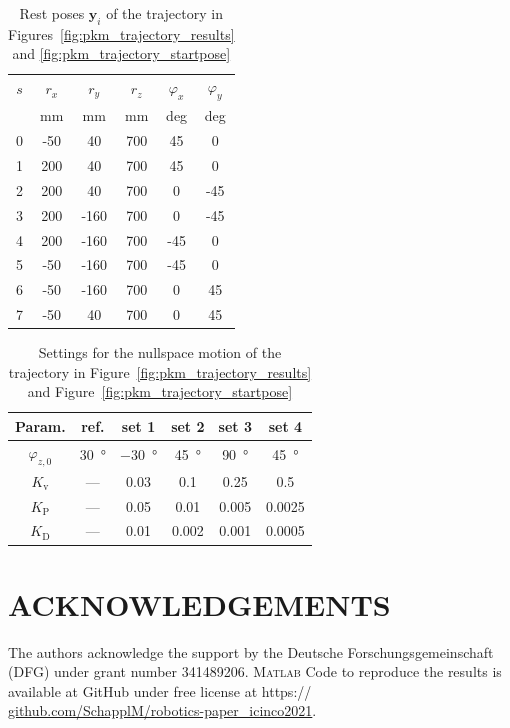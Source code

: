 \documentclass[a4paper,twoside]{article}
\begin{document}
\begin{table}[hb]
	\caption{Rest poses $\bm{y}_i$ of the trajectory in Figures~\ref{fig:pkm_trajectory_results} and \ref{fig:pkm_trajectory_startpose}}
	\label{tab:trajectory_points}
	\centering
	\begin{tabular}[t]{|c|c|c|c|c|c|}
		\hline
		$s$ & $r_x$ & $r_y$ & $r_z$ & $\varphi_x$ & $\varphi_y$ \\
		& mm & mm & mm & deg & deg \\
		\hline
		0 & -50 & 40 & 700 & 45 & 0\\
		1 & 200 & 40 & 700 & 45 & 0\\
		2 & 200 & 40 & 700 & 0 & -45\\
		3 & 200 & -160 & 700 & 0 & -45\\
		4 & 200 & -160 & 700 & -45 & 0\\
		5 & -50 & -160 & 700 & -45 & 0\\
		6 & -50 & -160 & 700 & 0 & 45\\
		7 & -50 & 40 & 700 & 0 & 45\\
		\hline
	\end{tabular}
\end{table}
\begin{table}[b]
	\caption{Settings for the nullspace motion  of the trajectory in Figure~\ref{fig:pkm_trajectory_results} and Figure~\ref{fig:pkm_trajectory_startpose}}
	\label{tab:trajectory_ik_settings}
	\centering
	\begin{tabular}[t]{|c|c|c|c|c|c|}
		\hline
		Param. & ref. & set 1 & set 2 & set 3 & set 4 \\
		\hline
		$\varphi_{z,0}$ & \SI{30}{\degree} & \SI{-30}{\degree} & \SI{45}{\degree} & \SI{90}{\degree} & \SI{45}{\degree}\\
		$K_\mathrm{v}$ & --- & 0.03 & 0.1 & 0.25 & 0.5\\
		$K_\mathrm{P}$ & --- & 0.05 & 0.01 & 0.005 & 0.0025\\
		$K_\mathrm{D}$ & --- & 0.01 & 0.002 & 0.001 & 0.0005\\
		\hline
	\end{tabular}
\end{table}

\newpage %

\section*{\uppercase{Acknowledgements}}

The authors acknowledge the support by the Deutsche Forschungsgemeinschaft (DFG) under grant number 341489206.
\textsc{Matlab} Code to reproduce the results is available at GitHub under free license at https://\\\url{github.com/SchapplM/robotics-paper_icinco2021}.


{\small
}
\end{document}
